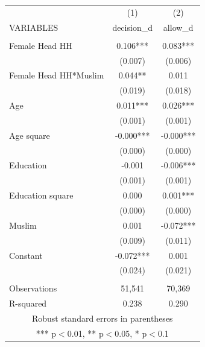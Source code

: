 \documentclass[]{article}
\begin{document}
\begin{tabular}{lcc} \hline
 & (1) & (2) \\
VARIABLES & decision\_d & allow\_d \\ \hline
 &  &  \\
Female Head HH & 0.106*** & 0.083*** \\
 & (0.007) & (0.006) \\
Female Head HH*Muslim & 0.044** & 0.011 \\
 & (0.019) & (0.018) \\
Age & 0.011*** & 0.026*** \\
 & (0.001) & (0.001) \\
Age square & -0.000*** & -0.000*** \\
 & (0.000) & (0.000) \\
Education & -0.001 & -0.006*** \\
 & (0.001) & (0.001) \\
Education square & 0.000 & 0.001*** \\
 & (0.000) & (0.000) \\
Muslim & 0.001 & -0.072*** \\
 & (0.009) & (0.011) \\
Constant & -0.072*** & 0.001 \\
 & (0.024) & (0.021) \\
 &  &  \\
Observations & 51,541 & 70,369 \\
 R-squared & 0.238 & 0.290 \\ \hline
\multicolumn{3}{c}{ Robust standard errors in parentheses} \\
\multicolumn{3}{c}{ *** p$<$0.01, ** p$<$0.05, * p$<$0.1} \\
\end{tabular}
\end{document}
